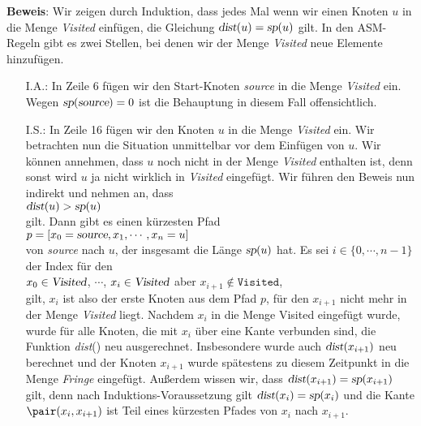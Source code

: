 \noindent
\textbf{Beweis}: Wir zeigen durch Induktion, dass jedes Mal wenn wir einen Knoten $u$ in die Menge
\textsl{Visited} einf\"ugen, die Gleichung $\textsl{dist}(u) = \textsl{sp}(u)$ gilt.
In den ASM-Regeln gibt es zwei Stellen, bei denen wir der Menge \textsl{Visited} neue
Elemente hinzuf\"ugen.
\begin{enumerate}
\item[I.A.:]
      In Zeile 6 f\"ugen wir den Start-Knoten \textsl{source} in die Menge \textsl{Visited}
      ein.  Wegen $\textsl{sp}(\textsl{source}) = 0$ ist die Behauptung in diesem Fall
      offensichtlich.
\item[I.S.:]
      In Zeile 16 f\"ugen wir den Knoten $u$ in die Menge \textsl{Visited} ein.
      Wir betrachten nun die Situation unmittelbar vor dem Einf\"ugen von $u$.
      Wir k\"onnen annehmen, dass $u$ noch nicht in der Menge \textsl{Visited}
      enthalten ist, denn sonst wird $u$  ja nicht wirklich in \textsl{Visited} eingef\"ugt.
      Wir f\"uhren den Beweis nun indirekt und nehmen an, dass 
      \\[0.2cm]
      \hspace*{1.3cm} $\textsl{dist}(u) > \textsl{sp}(u)$
      \\[0.2cm]
      gilt.  Dann gibt es einen k\"urzesten Pfad 
      \\[0.2cm]
      \hspace*{1.3cm} $p = [ x_0 = \textsl{source}, x_1, \cdots, x_n = u ]$
      \\[0.2cm]
      von \textsl{source} nach $u$, der insgesamt die L\"ange $\textsl{sp}(u)$ hat.
      Es sei  $i\in\{0,\cdots,n-1\}$ der Index f\"ur den 
      \\[0.2cm]
      \hspace*{1.3cm}
      $x_0\in \textsl{Visited}$, $\cdots$, $x_i\in \textsl{Visited}$ \quad aber \quad $x_{i+1} \not\in \mathtt{Visited}$,
      \\[0.2cm]
      gilt, $x_i$ ist also der erste Knoten aus dem Pfad $p$, f\"ur den $x_{i+1}$ nicht mehr
      in der Menge
      \textsl{Visited} liegt.  Nachdem $x_i$ in die Menge Visited eingef\"ugt wurde,
      wurde f\"ur alle Knoten, die mit $x_i$ \"uber eine Kante verbunden sind,
      die Funktion \textsl{dist}() neu ausgerechnet.  Insbesondere
      wurde auch $\textsl{dist}(x_{i+1})$ neu berechnet und der Knoten $x_{i+1}$ wurde 
      sp\"atestens zu diesem Zeitpunkt in die Menge \textsl{Fringe} eingef\"ugt.
      Au{\ss}erdem wissen wir, dass $\textsl{dist}(x_{i+1}) = \textsl{sp}(x_{i+1})$ gilt,
      denn nach Induktions-Voraussetzung gilt $\textsl{dist}(x_i) = \textsl{sp}(x_i)$
      und die Kante $\pair(x_i,x_{i+1})$ ist Teil eines k\"urzesten Pfades von $x_i$ nach $x_{i+1}$.
      

\end{enumerate}
